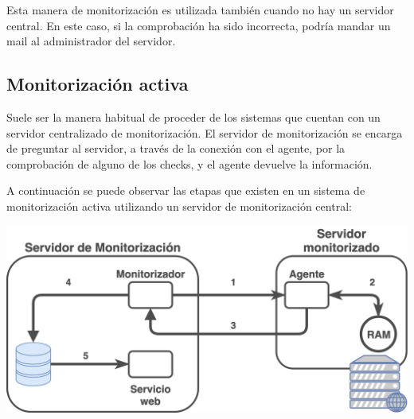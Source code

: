 Esta manera de monitorización es utilizada también cuando no hay un servidor central. En este caso, si la comprobación ha sido incorrecta, podría mandar un mail al administrador del servidor.

\subsection{Monitorización activa}
Suele ser la manera habitual de proceder de los sistemas que cuentan con un servidor centralizado de monitorización. El servidor de monitorización se encarga de preguntar al servidor, a través de la conexión con el agente, por la comprobación de alguno de los checks, y el agente devuelve la información.

A continuación se puede observar las etapas que existen en un sistema de monitorización activa utilizando un servidor de monitorización central:

\begin{tcolorbox}[colback=white,title=Proceso de monitorización activa]
    \centering
    \includegraphics[width=0.6\linewidth]{monitorizacion_activa.png}
\end{tcolorbox}

